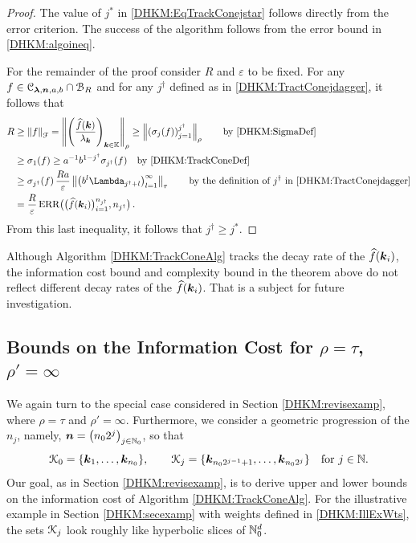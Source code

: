 \documentclass[USenglish]{article}
\theoremstyle{dgthm}
\theoremstyle{dgthm}
\theoremstyle{dgthm}
\theoremstyle{dgthm}
\theoremstyle{dgdef}
\theoremstyle{definition}
\DeclareMathOperator{\DHKMERR}{ERR}
\newcommand{\DHKMdataNjd}{\bigl(\hf(\bsk_i)\bigr)_{i=1}^{n_{j^\dagger}}}
\newcommand{\DHKMERRNjd}{\DHKMERR\bigl(\DHKMdataNjd,n_{j^\dagger}\bigr)}
\newcommand{\hf}{\widehat{f}}
\newcommand{\norm}[2][{}]{\ensuremath{\left \lVert #2 \right \rVert}_{#1}}
\begin{document}
\begin{proof}
The value of $j^*$ in \eqref{DHKM:EqTrackConejstar} follows directly from the error criterion. The success of the algorithm follows from the error bound in \eqref{DHKM:algoineq}.

For the remainder of the proof consider $R$ and $\varepsilon$ to be fixed.  For any $f \in  {\mathcal{C}}_{\boldsymbol{\lambda},{\boldsymbol{n}},a,b} \cap {\mathcal{B}}_R$ and for any $j^\dagger$ defined  as in \eqref{DHKM:TractConejdagger}, it follows that
\begin{align*}
R &\ge \norm[\calF]{f} = \norm[\rho]{\left(\frac{\hf(\bsk)}{\lambda_{\bsk}} \right)_{\bsk \in \bbK}}
 \ge \norm[\rho]{\left(\sigma_j(f)\right)_{j=1}^{j^\dagger}}  
 \qquad \text{by \eqref{DHKM:SigmaDef} } \\
& \ge \sigma_1(f) \ge a^{-1}b^{1-j^\dagger}\sigma_{j^\dagger}(f) \quad \text{by  \eqref{DHKM:TrackConeDef}}\\
& \ge \sigma_{j^\dagger}(f)\,\frac{Ra}{\varepsilon} \norm[\tau]{ \bigl(b^l \Lambda_{j^\dagger+l} \bigr)_{l=1}^\infty}
\qquad \text{by the definition of } j^\dagger \text{ in \eqref{DHKM:TractConejdagger}} \\
& = \frac{R}{\varepsilon} \DHKMERRNjd\, .
\end{align*}
From this last inequality, it follows that $j^\dagger \ge j^*$.
\end{proof} 

Although Algorithm \ref{DHKM:TrackConeAlg} tracks the decay rate of the $\hf(\bsk_i)$, the information cost bound and complexity bound in the theorem above do not reflect different decay rates of the $\hf(\bsk_i)$. That is a subject for future investigation.  

\subsection{Bounds on the Information Cost for $\rho = \tau$, $\rho' = \infty$}\label{DHKM:SecDecayRhoEqTau}
We again turn to the special case considered in Section \ref{DHKM:revisexamp}, where $\rho = \tau$ and $\rho' = \infty$.  Furthermore, we consider a geometric progression of the $n_j$, namely, ${\boldsymbol{n}} = \bigl (n_02^j \bigr)_{j \in {\mathbb{N}}_0}$, so that
\[
{\mathcal{K}}_0 = \{{\boldsymbol{k}}_{1}, \ldots, {\boldsymbol{k}}_{n_0}\}, \qquad {\mathcal{K}}_j = \{{\boldsymbol{k}}_{n_0 2^{j-1}+1}, \ldots, {\boldsymbol{k}}_{n_02^j}\} \quad \text{for } j \in {\mathbb{N}}.
\]
Our goal, as in Section \ref{DHKM:revisexamp}, is to derive upper and lower bounds on the information cost of Algorithm \ref{DHKM:TrackConeAlg}. For the illustrative example in Section \ref{DHKM:secexamp} with weights defined in \eqref{DHKM:IllExWts}, the sets ${\mathcal{K}}_j$ look roughly like hyperbolic slices of ${\mathbb{N}}_0^d$.
\end{document}

